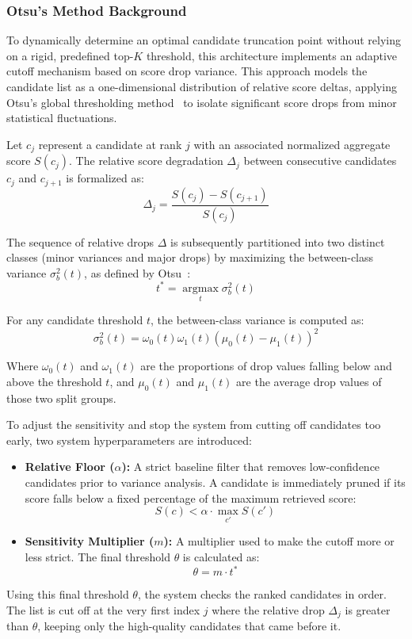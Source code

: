 \subsubsection{Otsu's Method Background}
\label{subsec:otsu_cutoff}
To dynamically determine an optimal candidate truncation point without relying on a rigid, predefined top-$K$ threshold, this architecture implements an adaptive cutoff mechanism based on score drop variance. This approach models the candidate list as a one-dimensional distribution of relative score deltas, applying Otsu's global thresholding method~\cite{4310076} to isolate significant score drops from minor statistical fluctuations.

Let $c_j$ represent a candidate at rank $j$ with an associated normalized aggregate score $S(c_j)$. The relative score degradation $\Delta_j$ between consecutive candidates $c_j$ and $c_{j+1}$ is formalized as:
$$\Delta_j = \frac{S(c_j) - S(c_{j+1})}{S(c_j)}$$

The sequence of relative drops $\Delta$ is subsequently partitioned into two distinct classes (minor variances and major drops) by maximizing the between-class variance $\sigma_b^2(t)$, as defined by Otsu~\cite{4310076}:
$$t^* = \operatorname*{argmax}_{t} \sigma^2_b(t)$$

For any candidate threshold $t$, the between-class variance is computed as:
$$\sigma_b^2(t) = \omega_0(t) \omega_1(t) (\mu_0(t) - \mu_1(t))^2$$

Where $\omega_0(t)$ and $\omega_1(t)$ are the proportions of drop values falling below and above the threshold $t$, and $\mu_0(t)$ and $\mu_1(t)$ are the average drop values of those two split groups.

To adjust the sensitivity and stop the system from cutting off candidates too early, two system hyperparameters are introduced:
\begin{itemize}
    \item \textbf{Relative Floor ($\alpha$):} A strict baseline filter that removes low-confidence candidates prior to variance analysis. A candidate is immediately pruned if its score falls below a fixed percentage of the maximum retrieved score:
    $$S(c) < \alpha \cdot \max_{c'} S(c')$$
    \item \textbf{Sensitivity Multiplier ($m$):} A multiplier used to make the cutoff more or less strict. The final threshold $\theta$ is calculated as:
    $$\theta = m \cdot t^*$$
\end{itemize}

Using this final threshold $\theta$, the system checks the ranked candidates in order. The list is cut off at the very first index $j$ where the relative drop $\Delta_j$ is greater than $\theta$, keeping only the high-quality candidates that came before it.

